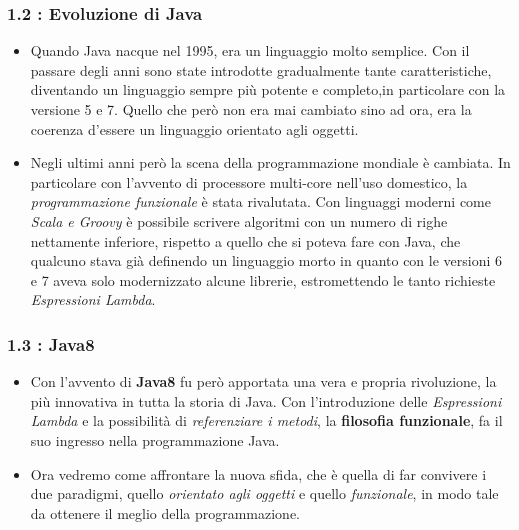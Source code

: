 \documentclass{beamer}
\begin{document}

\begin{frame}
	\frametitle{\textbf{1.2 : Evoluzione di Java}}
		\begin{itemize}
			\item
				Quando Java nacque nel 1995, era un linguaggio molto semplice. Con il passare degli anni sono state introdotte gradualmente tante caratteristiche, diventando un linguaggio sempre più potente e completo,in particolare con la versione 5 e 7. Quello che però non era mai cambiato sino ad ora, era la coerenza d'essere un linguaggio orientato agli oggetti.
			\item 
				Negli ultimi anni però la scena della programmazione mondiale è cambiata. In particolare con l'avvento di processore multi-core nell'uso domestico, la \textit{programmazione funzionale} è stata rivalutata. Con linguaggi moderni come \textit{Scala e Groovy} è possibile scrivere algoritmi con un numero di righe nettamente inferiore, rispetto a quello che si poteva fare con Java, che qualcuno stava già definendo un linguaggio morto in quanto con le versioni 6 e 7 aveva solo modernizzato alcune librerie, estromettendo le tanto richieste \textit{Espressioni Lambda}.
		\end{itemize}
\end{frame}


\begin{frame}
	\frametitle{\textbf{1.3 : Java8}}
		\begin{itemize}
			\item
				Con l'avvento di \textbf{Java8} fu però apportata una vera e propria rivoluzione, la più innovativa in tutta la storia di Java. Con l'introduzione delle \textit{Espressioni Lambda} e la possibilità di \textit{referenziare i metodi}, la \textbf{filosofia funzionale}, fa il suo ingresso nella programmazione Java.
			\item
				Ora vedremo come affrontare la nuova sfida, che è quella di far convivere i due paradigmi, quello \textit{orientato agli oggetti} e quello \textit{funzionale}, in modo tale da ottenere il meglio della programmazione.				
		\end{itemize}
\end{frame}


\begin{frame}
\end{frame}
\end{document}
